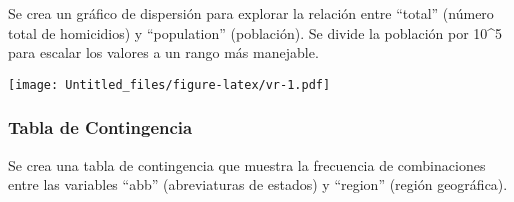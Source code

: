 \documentclass[
]{article}
\newenvironment{Shaded}{\begin{snugshade}}{\end{snugshade}}
\newcommand{\AttributeTok}[1]{\textcolor[rgb]{0.13,0.29,0.53}{#1}}
\newcommand{\DecValTok}[1]{\textcolor[rgb]{0.00,0.00,0.81}{#1}}
\newcommand{\FunctionTok}[1]{\textcolor[rgb]{0.13,0.29,0.53}{\textbf{#1}}}
\newcommand{\NormalTok}[1]{#1}
\newcommand{\SpecialCharTok}[1]{\textcolor[rgb]{0.81,0.36,0.00}{\textbf{#1}}}
\newcommand{\StringTok}[1]{\textcolor[rgb]{0.31,0.60,0.02}{#1}}
\begin{document}
Se crea un gráfico de dispersión para explorar la relación entre
``total'' (número total de homicidios) y ``population'' (población). Se
divide la población por 10\^{}5 para escalar los valores a un rango más
manejable.

\begin{Shaded}
\end{Shaded}

\texttt{[image: Untitled\_files/figure-latex/vr-1.pdf]}

\hypertarget{tabla-de-contingencia}{%
\subsubsection{Tabla de Contingencia}\label{tabla-de-contingencia}}

Se crea una tabla de contingencia que muestra la frecuencia de
combinaciones entre las variables ``abb'' (abreviaturas de estados) y
``region'' (región geográfica).

\begin{Shaded}
\end{Shaded}
\end{document}
